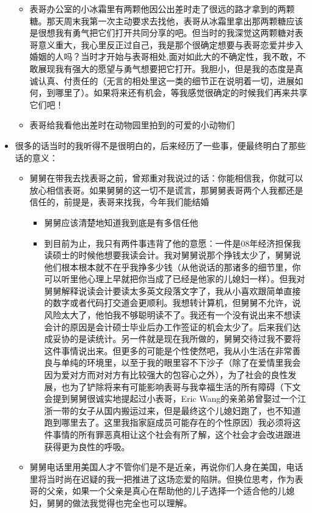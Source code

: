 \documentclass[9pt, b5paper]{article}
\begin{document}
\begin{itemize}
\begin{itemize}
\item 表哥办公室的小冰霜里有两颗他因公出差时走了很远的路才拿到的两颗糖。那天周末我第一次主动要求去找他，表哥从冰霜里拿出那两颗糖应该是很想我有勇气把它们打开共同分享的吧。但当时的我深觉这两颗糖对表哥意义重大，我心里反正过自己，我是那个很确定想要与表哥恋爱并步入婚姻的人吗？当时才开始与表哥相处,面对如此大的不确定性，我不敢，不敢展现我有强大的愿望与勇气想要把它打开。我胆小，但是我的态度是真诚认真、付责任的（无言的相处里这一类的细节正在说明着一切，进展如何，到哪里了）。如果将来还有机会，等我感觉很确定的时候我们再来共享它们吧！
\item 表哥给我看他出差时在动物园里拍到的可爱的小动物们
\end{itemize}
\item 很多的话当时的我听得不是很明白的，后来经历了一些事，便最终明白了那些话的意义：
\begin{itemize}
\item 舅舅在带我去找表哥之前，曾郑重对我说过的话：你能相信我，你就可以放心相信表哥。如果舅舅的这一切不是谎言，那舅舅表哥两个人我都还是信任的，前提是，表哥来找我，今年我们能结婚
\begin{itemize}
\item 舅舅应该清楚地知道我到底是有多信任他
\item 到目前为止，我只有两件事违背了他的意愿：一件是08年经济担保我读硕士的时候他想要我读会计。我对舅舅说那个挣钱太少了，舅舅说他们根本根本就不在乎我挣多少钱（从他说话的那诸多的细节里，你可以听里他心理上早就把你当成了已经是他家的儿媳妇一样）。但我对舅舅解释说读会计要读太多英文段落文字了，我从小喜欢跟简单直接的数字或者代码打交道会更顺利。我想转计算机，但舅舅不允许，说风险太大了，他怕我不够聪明读不了。我还有一个没有说出来不想读会计的原因是会计硕士毕业后办工作签证的机会太少了。后来我们达成妥协的是读统计。另一件就是现在我所做的，舅舅交待过我不要将这件事情说出来。但更多的可能是个性使然吧，我从小生活在非常善良与单纯的环境里，以至于我的眼里容不下沙子（除了在爱情里我会因为爱对方而对对方有比较强大的包容心之外），为了社会的良性发展，也为了铲除将来有可能影响表哥与我幸福生活的所有障碍（下文会提到舅舅很诚实地提起过小表哥，Eric Wang的亲弟弟曾娶过一个江浙一带的女子从国内搬运过来，但是最终这个儿媳妇跑了，也不知道跑到哪里去了。这里我指家庭成员可能存在的个性原因）我必须将这件事情的所有罪恶真相让这个社会有所了解，这个社会才会改进跟进获得更为良性的呼吸。
\end{itemize}
\item 舅舅电话里用美国人才不管你们是不是近亲，再说你们人身在美国，电话里将当时尚在迟疑的我一把推进了这场恋爱的陷阱。但换位思考，作为表哥的父亲，如果一个父亲是真心在帮助他的儿子选择一个适合他的儿媳妇，舅舅的做法我觉得也完全也可以理解。

\end{itemize}
\end{itemize}
\end{document}
